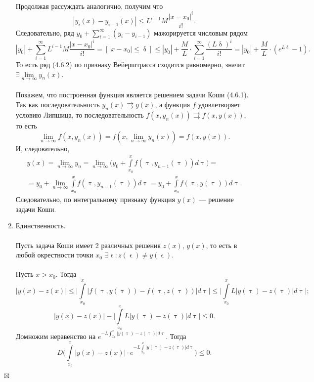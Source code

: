 \documentclass[a4paper, 12pt]{report}
\newenvironment{Proof} %
{\par\noindent{$\blacklozenge$}} %
{\hfill$\scriptstyle\boxtimes$}
\renewcommand{\leq}{\leqslant}
\renewcommand{\delta}{\updelta}
\renewcommand{\tau}{\uptau}
\renewcommand{\epsilon}{\upvarepsilon}
\newcommand{\intx}{\int\limits_{x_0}^x}
\begin{document}
\begin{Proof}
\begin{enumerate}
\begin{multline*}
				\end{multline*}
			Продолжая рассуждать аналогично, получим что $$|y_i(x) - y_{i-1}(x)|\leq L^{i-1}M\dfrac{|x - x_0|^i}{i!}.$$
			Следовательно, ряд $y_0 + \sum_{i=1}^{\infty}(y_i - y_{i-1})$ мажорируется числовым рядом
			$$|y_0| + \sum_{i=1}^{\infty}L^{i-1}M\dfrac{|x - x_0|^i}{i!} = [|x-x_0|\leq\delta] \leq |y_0| + \dfrac{M}{L}\cdot\sum_{i=1}^{\infty}\dfrac{(L\delta)^i}{i!} = |y_0|+\dfrac{M}{L}\cdot (e^{L\delta} - 1).$$
			То есть ряд (4.6.2) по признаку Вейерштрасса сходится равномерно, значит $\exists \lim\limits_{n\to \infty}y_n(x)$. \\\\
			Покажем, что построенная функция является решением задачи Коши (4.6.1). Так как последовательность $y_n(x)\rightrightarrows y(x)$, а функция $f$ удовлетворяет условию Липшица, то последовательность $f(x,y_n(x))\rightrightarrows f(x,y(x))$, то есть
			$$\lim\limits_{n\to \infty}f(x,y_n(x)) = f(x, \lim\limits_{n\to\infty} y_n(x)) = f(x,y(x)).$$
			И, следовательно, \begin{multline*}
				y(x) = \lim\limits_{n\to \infty} y_n = \lim\limits_{n\to \infty}\Big(y_0 + \intx f(\tau, y_{n-1}(\tau))d\tau\Big) =\\= y_0 + \lim\limits_{n\to \infty}\intx f(\tau, y_{n-1}(\tau))d\tau = y_0 + \intx f(\tau, y(\tau))d\tau.
			\end{multline*}
		Следовательно, по интегральному признаку функция $y(x)$ --- решение задачи Коши.
		\item Единственность.\\\\
		Пусть задача Коши имеет 2 различных решения $z(x)$, $y(x)$, то есть в любой окрестности точки $x_0$ $\exists\epsilon : z(\epsilon)\ne y(\epsilon)$.\\\\
		Пусть $x > x_0$. Тогда$$
			|y(x) - z(x)| \leq \Big|\intx \big|f(\tau,y(\tau)) - f(\tau,z(\tau))\big|d\tau\Big|\leq \Big|\intx L \big|y(\tau) -z(\tau)\big|d\tau\Big|;
		$$
		$$|y(x)-z(x)| - \Big|\intx L \big|y(\tau) -z(\tau)\big|d\tau\Big| \leq 0.$$
		Домножим неравенство на $e^{-L\int_{x_0}^x|y(\tau) - z(\tau)|d\tau}$. Тогда
			$$D\Big(\intx |y(x) - z(x)|\cdot e^{-L\int\limits_{x_0}^x|y(\tau) - z(\tau)|d\tau}\Big)\leq 0.$$
			\end{enumerate}
\end{Proof}
\end{document}
